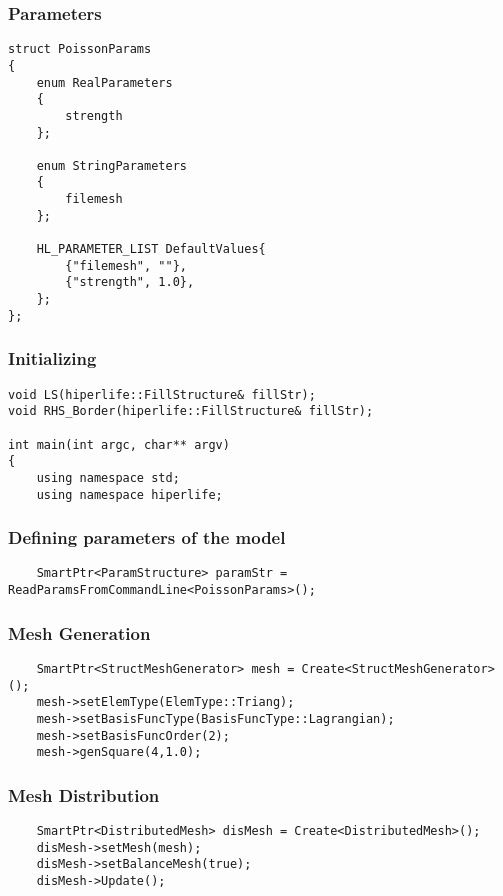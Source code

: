 \documentclass[]{article}
\begin{document}
\subsubsection{Parameters} \label{sec: ppr}
\begin{lstlisting}
struct PoissonParams
{
	enum RealParameters
	{
		strength
	};
	
	enum StringParameters
	{
		filemesh
	};
	
	HL_PARAMETER_LIST DefaultValues{
		{"filemesh", ""},
		{"strength", 1.0},
	};
};
\end{lstlisting}

\subsubsection{Initializing} \label{sec: main}
\begin{lstlisting}
void LS(hiperlife::FillStructure& fillStr);
void RHS_Border(hiperlife::FillStructure& fillStr);

int main(int argc, char** argv)
{
	using namespace std;
	using namespace hiperlife;
\end{lstlisting}

\subsubsection{Defining parameters of the model} \label{sec: Pstr}
\begin{lstlisting}
	SmartPtr<ParamStructure> paramStr = ReadParamsFromCommandLine<PoissonParams>();
\end{lstlisting}

\subsubsection{Mesh Generation} \label{sec: mshG}
\begin{lstlisting}
	SmartPtr<StructMeshGenerator> mesh = Create<StructMeshGenerator>();
	mesh->setElemType(ElemType::Triang);
	mesh->setBasisFuncType(BasisFuncType::Lagrangian);
	mesh->setBasisFuncOrder(2);
	mesh->genSquare(4,1.0);
\end{lstlisting}

\subsubsection{Mesh Distribution} \label{sec: mshD}
\begin{lstlisting}
	SmartPtr<DistributedMesh> disMesh = Create<DistributedMesh>();
	disMesh->setMesh(mesh);
	disMesh->setBalanceMesh(true);
	disMesh->Update();
\end{lstlisting}
\end{document}
